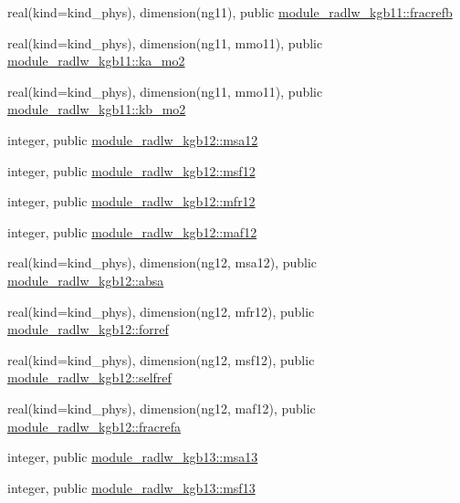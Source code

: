 \begin{DoxyCompactItemize}
\item 
real(kind=kind\+\_\+phys), dimension(ng11), public \hyperlink{group__module__radlw__main_ga0a89a2686ebc70a2c0d8577b89384a56}{module\+\_\+radlw\+\_\+kgb11\+::fracrefb}
\item 
real(kind=kind\+\_\+phys), dimension(ng11, mmo11), public \hyperlink{group__module__radlw__main_ga8791eb290525c0d08fefa33ca23569c8}{module\+\_\+radlw\+\_\+kgb11\+::ka\+\_\+mo2}
\item 
real(kind=kind\+\_\+phys), dimension(ng11, mmo11), public \hyperlink{group__module__radlw__main_gaebc48e152bb90794b6d0b426f6c5f9e4}{module\+\_\+radlw\+\_\+kgb11\+::kb\+\_\+mo2}
\item 
integer, public \hyperlink{namespacemodule__radlw__kgb12_ad1ddd94fe11b11485502d1fe6f5a1615}{module\+\_\+radlw\+\_\+kgb12\+::msa12}
\item 
integer, public \hyperlink{group__module__radlw__main_ga3282a15ee0faaafd65509536a59e5b4f}{module\+\_\+radlw\+\_\+kgb12\+::msf12}
\item 
integer, public \hyperlink{group__module__radlw__main_gacd751a2e48d0286e3d25a9b658a8367a}{module\+\_\+radlw\+\_\+kgb12\+::mfr12}
\item 
integer, public \hyperlink{group__module__radlw__main_ga9d7c05182e21605108bd65f47bb5569c}{module\+\_\+radlw\+\_\+kgb12\+::maf12}
\item 
real(kind=kind\+\_\+phys), dimension(ng12, msa12), public \hyperlink{group__module__radlw__main_ga7600bfa19dde3b47d8479f5766ee0c93}{module\+\_\+radlw\+\_\+kgb12\+::absa}
\item 
real(kind=kind\+\_\+phys), dimension(ng12, mfr12), public \hyperlink{group__module__radlw__main_ga97dac0d0e010441171e09e317e5aeee8}{module\+\_\+radlw\+\_\+kgb12\+::forref}
\item 
real(kind=kind\+\_\+phys), dimension(ng12, msf12), public \hyperlink{group__module__radlw__main_ga8aaf83ec7a08a244fd1e5396c9fd9b1d}{module\+\_\+radlw\+\_\+kgb12\+::selfref}
\item 
real(kind=kind\+\_\+phys), dimension(ng12, maf12), public \hyperlink{group__module__radlw__main_ga58ff4f54c11eb12f7ab5157823981b16}{module\+\_\+radlw\+\_\+kgb12\+::fracrefa}
\item 
integer, public \hyperlink{namespacemodule__radlw__kgb13_a07932a22e5f8de248765a207e170ce6f}{module\+\_\+radlw\+\_\+kgb13\+::msa13}
\item 
integer, public \hyperlink{group__module__radlw__main_ga7f88590d2a9fc392b04e89fd3d4bf2bf}{module\+\_\+radlw\+\_\+kgb13\+::msf13}
\item 

\end{DoxyCompactItemize}

